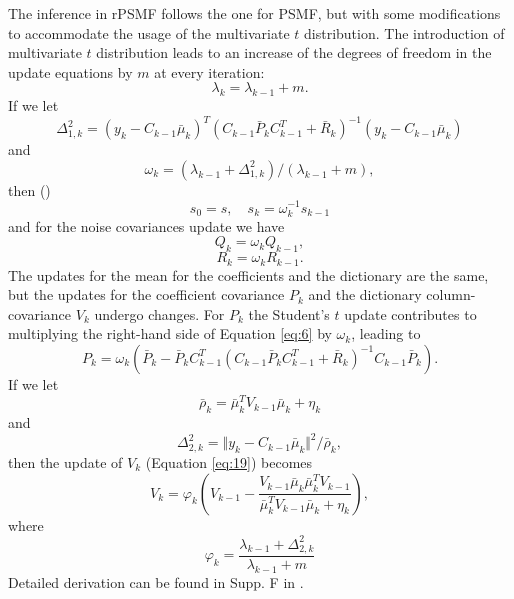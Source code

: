 \documentclass{mldsmsc}
\begin{document}
The inference in rPSMF follows the one for PSMF, but with some modifications to accommodate the usage of the multivariate $t$ distribution. The introduction of multivariate $t$ distribution leads to an increase of the degrees of freedom in the update equations by $m$ at every iteration:
\begin{equation}
    \lambda_k = \lambda_{k-1} + m.
\end{equation}
If we let 
\begin{equation}
    \Delta^2_{1,k} = (y_k - C_{k-1}\bar{\mu}_k)^T (C_{k-1} \bar{P}_k C_{k-1}^T + \bar{R}_k)^{-1} (y_k - C_{k-1}\bar{\mu}_k)
\end{equation}
and 
\begin{equation}
    \omega_k = (\lambda_{k-1} + \Delta^2_{1,k}) / (\lambda_{k-1} + m),
\end{equation}
then (\cite{akyildiz2021probabilistic})
\begin{equation}
    s_0 = s, \quad s_k = \omega_k^{-1} s_{k-1}
\end{equation}
and for the noise covariances update we have 
\begin{equation}
    Q_k = \omega_k Q_{k-1},
\end{equation}
\begin{equation}
    R_k = \omega_k R_{k-1}.
\end{equation}
The updates for the mean for the coefficients and the dictionary are the same, but the updates for the coefficient covariance $P_k$ and the dictionary column-covariance $V_k$ undergo changes. For $P_k$ the Student's $t$ update contributes to multiplying the right-hand side of Equation \ref{eq:6} by $\omega_k$, leading to
\begin{equation}
    P_k = \omega_k \left(\bar{P}_k - \bar{P}_k C_{k-1}^T \left(C_{k-1} \bar{P}_k C_{k-1}^T + \bar{R}_k\right)^{-1} C_{k-1} \bar{P}_k\right).
\end{equation}
If we let 
\begin{equation}
    \bar{\rho}_k = \bar{\mu}_k^T V_{k-1} \bar{\mu}_k + \eta_k
\end{equation}
and
\begin{equation}
    \Delta^2_{2,k} = \Vert y_k - C_{k-1}\bar{\mu}_k \Vert^2 / \bar{\rho}_k,
\end{equation}
then the update of $V_k$ (Equation \ref{eq:19}) becomes
\begin{equation}
    V_k = \varphi_k \left(V_{k-1} - \frac{V_{k-1} \bar{\mu}_k \bar{\mu}_k^T V_{k-1}}{\bar{\mu}_k^T V_{k-1} \bar{\mu}_k + \eta_k}\right),
\end{equation}
where 
\begin{equation}
    \varphi_k = \frac{\lambda_{k-1} + \Delta^2_{2,k}}{\lambda_{k-1} + m}
\end{equation}
Detailed derivation can be found in Supp. F in \cite{akyildiz2021probabilistic}.
\end{document}
